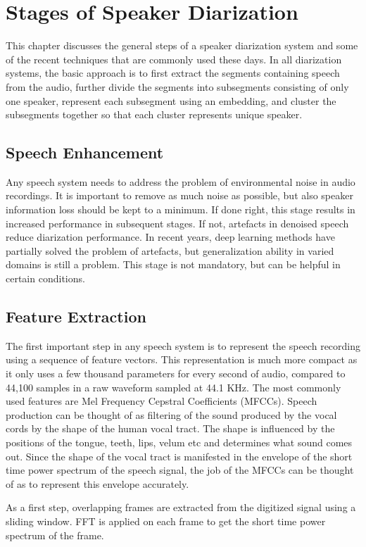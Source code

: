 \chapter{Stages of Speaker Diarization}
This chapter discusses the general steps of a speaker diarization system and some of the recent techniques that are commonly used these days. In all diarization systems, the basic approach is to first extract the segments containing speech from the audio, further divide the segments into subsegments consisting of only one speaker, represent each subsegment using an embedding, and cluster the subsegments together so that each cluster represents unique speaker.

\section{Speech Enhancement}
Any speech system needs to address the problem of environmental noise in audio recordings. It is important to remove as much noise as possible, but also speaker information loss should be kept to a minimum. If done right, this stage results in increased performance in subsequent stages. If not, artefacts in denoised speech reduce diarization performance. In recent years, deep learning methods have partially solved the problem of artefacts, but generalization ability in varied domains is still a problem. This stage is not mandatory, but can be helpful in certain conditions.

\section{Feature Extraction}
The first important step in any speech system is to represent the speech recording using a sequence of feature vectors. This representation is much more compact as it only uses a few thousand parameters for every second of audio, compared to 44,100 samples in a raw waveform sampled at 44.1 KHz. The most commonly used features are Mel Frequency Cepstral Coefficients (MFCCs). Speech production can be thought of as filtering of the sound produced by the vocal cords by the shape of the human vocal tract. The shape is influenced by the positions of the tongue, teeth, lips, velum etc and determines what sound comes out. Since the shape of the vocal tract is manifested in the envelope of the short time power spectrum of the speech signal, the job of the MFCCs can be thought of as to represent this envelope accurately.

As a first step, overlapping frames are extracted from the digitized signal using a sliding window. FFT is applied on each frame to get the short time power spectrum of the frame.

